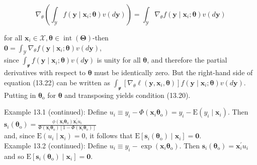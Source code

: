 \documentclass[10pt]{article}
\begin{document}
\begin{equation*}
\nabla_{\theta}\left(\int_{\mathscr{Y}} f\left(\mathbf{y} \mid \mathbf{x}_{i} ; \boldsymbol{\theta}\right) v(d \mathbf{y})\right)=\int_{\mathscr{Y}} \nabla_{\theta} f\left(\mathbf{y} \mid \mathbf{x}_{i} ; \boldsymbol{\theta}\right) v(d \mathbf{y}) \tag{13.21}
\end{equation*}


for all $\mathbf{x}_{i} \in \mathscr{X}, \boldsymbol{\theta} \in \operatorname{int}(\boldsymbol{\Theta})$-then\\
$\mathbf{0}=\int_{\mathscr{Y}} \nabla_{\theta} f\left(\mathbf{y} \mid \mathbf{x}_{i} ; \boldsymbol{\theta}\right) v(d \mathbf{y})$,\\
since $\int_{\mathscr{y}} f\left(\mathbf{y} \mid \mathbf{x}_{i} ; \boldsymbol{\theta}\right) v(d \mathbf{y})$ is unity for all $\boldsymbol{\theta}$, and therefore the partial derivatives with respect to $\boldsymbol{\theta}$ must be identically zero. But the right-hand side of equation (13.22) can be written as $\int_{\mathscr{y}}\left[\nabla_{\theta} \ell\left(\mathbf{y}, \mathbf{x}_{i}, \boldsymbol{\theta}\right)\right] f\left(\mathbf{y} \mid \mathbf{x}_{i} ; \boldsymbol{\theta}\right) v(d \mathbf{y})$. Putting in $\boldsymbol{\theta}_{\mathrm{o}}$ for $\boldsymbol{\theta}$ and transposing yields condition (13.20).

Example 13.1 (continued): Define $u_{i} \equiv y_{i}-\Phi\left(\mathbf{x}_{i} \boldsymbol{\theta}_{\mathrm{o}}\right)=y_{i}-\mathrm{E}\left(y_{i} \mid \mathbf{x}_{i}\right)$. Then\\
$\mathbf{s}_{i}\left(\boldsymbol{\theta}_{\mathrm{o}}\right)=\frac{\phi\left(\mathbf{x}_{i} \boldsymbol{\theta}_{\mathrm{o}}\right) \mathbf{x}_{i}^{\prime} u_{i}}{\Phi\left(\mathbf{x}_{i} \boldsymbol{\theta}_{\mathrm{o}}\right)\left[1-\Phi\left(\mathbf{x}_{i} \boldsymbol{\theta}_{\mathrm{o}}\right)\right]}$\\
and, since $\mathrm{E}\left(u_{i} \mid \mathbf{x}_{i}\right)=0$, it follows that $\mathrm{E}\left[\mathbf{s}_{i}\left(\boldsymbol{\theta}_{\mathrm{o}}\right) \mid \mathbf{x}_{i}\right]=\mathbf{0}$.\\
Example 13.2 (continued): Define $u_{i} \equiv y_{i}-\exp \left(\mathbf{x}_{i} \boldsymbol{\theta}_{\mathrm{o}}\right)$. Then $\mathbf{s}_{i}\left(\boldsymbol{\theta}_{\mathrm{o}}\right)=\mathbf{x}_{i}^{\prime} u_{i}$ and so $\mathrm{E}\left[\mathbf{s}_{i}\left(\boldsymbol{\theta}_{\mathrm{o}}\right) \mid \mathbf{x}_{i}\right]=\mathbf{0}$.
\end{document}
